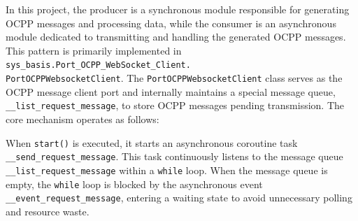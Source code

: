 \documentclass[
	english,
	ruledheaders=section,%
	class=report,%
	thesis={type=Report},%
	accentcolor=9c,%
	custommargins=true,%
	marginpar=false,%
	parskip=half-,%
	fontsize=11pt,%
	logofile={img/tuda_logo.pdf}, %
]{tudapub}
\begin{document}

In this project, the producer is a synchronous module responsible for generating \ac{OCPP} messages and processing data, while the consumer is an asynchronous module dedicated to transmitting and handling the generated \ac{OCPP} messages. This pattern is primarily implemented in \texttt{sys\_basis.Port\_OCPP\_WebSocket\_Client.\\PortOCPPWebsocketClient}. The \texttt{PortOCPPWebsocketClient} class serves as the \ac{OCPP} message client port and internally maintains a special message queue,\\\texttt{\_\_list\_request\_message}, to store \ac{OCPP} messages pending transmission. The core mechanism operates as follows:


When \texttt{start()} is executed, it starts an asynchronous coroutine task\\\texttt{\_\_send\_request\_message}. This task continuously listens to the message queue\\\texttt{\_\_list\_request\_message} within a \texttt{while} loop. When the message queue is empty, the \texttt{while} loop is blocked by the asynchronous event \texttt{\_\_event\_request\_message}, entering a waiting state to avoid unnecessary polling and resource waste.

\end{document}

